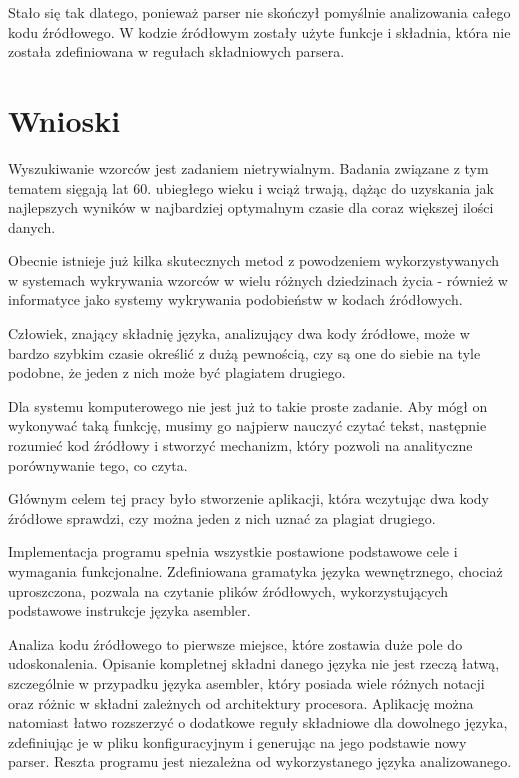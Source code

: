 \documentclass[a4paper,12pt,twoside]{article}
\begin{document}
Stało się tak dlatego, ponieważ parser nie skończył pomyślnie analizowania całego kodu źródłowego. W kodzie źródłowym zostały użyte funkcje i składnia, która nie została zdefiniowana w regułach składniowych parsera.

\newpage

\section{Wnioski}
Wyszukiwanie wzorców jest zadaniem nietrywialnym. Badania związane z tym tematem sięgają lat 60. ubiegłego wieku i wciąż trwają, dążąc do uzyskania jak najlepszych wyników w najbardziej optymalnym czasie dla coraz większej ilości danych.

Obecnie istnieje już kilka skutecznych metod z powodzeniem wykorzystywanych w systemach wykrywania wzorców w wielu różnych dziedzinach życia - również w informatyce jako systemy wykrywania podobieństw w kodach źródłowych.

Człowiek, znający składnię języka, analizujący dwa kody źródłowe, może w bardzo szybkim czasie określić z dużą pewnością, czy są one do siebie na tyle podobne, że jeden z nich może być plagiatem drugiego. 

Dla systemu komputerowego nie jest już to takie proste zadanie. Aby mógł on wykonywać taką funkcję, musimy go najpierw nauczyć czytać tekst, następnie rozumieć kod źródłowy i stworzyć mechanizm, który pozwoli na analityczne porównywanie tego, co czyta.

Głównym celem tej pracy było stworzenie aplikacji, która wczytując dwa kody źródłowe sprawdzi, czy można jeden z nich uznać za plagiat drugiego.

Implementacja programu spełnia wszystkie postawione podstawowe cele i wymagania funkcjonalne. Zdefiniowana gramatyka języka wewnętrznego, chociaż uproszczona, pozwala na czytanie plików źródłowych, wykorzystujących podstawowe instrukcje języka asembler.

Analiza kodu źródłowego to pierwsze miejsce, które zostawia duże pole do udoskonalenia. Opisanie kompletnej składni danego języka nie jest rzeczą łatwą, szczególnie w przypadku języka asembler, który posiada wiele różnych notacji oraz różnic w składni zależnych od architektury procesora. Aplikację można natomiast łatwo rozszerzyć o dodatkowe reguły składniowe dla dowolnego języka, zdefiniując je w pliku konfiguracyjnym i generując na jego podstawie nowy parser. Reszta programu jest niezależna od wykorzystanego języka analizowanego.
\end{document}
